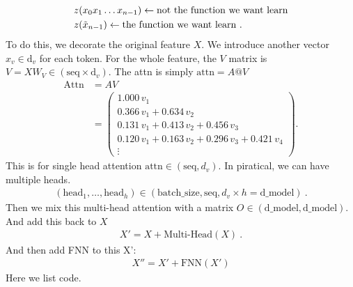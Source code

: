 \documentclass{article}
\newcommand{\bs}{\textrm{batch\_size}}
\newcommand{\seq}{\textrm{seq}}
\newcommand{\dm}{\textrm{d\_model}}
\begin{document}
\begin{align}
    &z(x_0x_1\dots x_{n-1}) \leftarrow \text{not the function we want learn} \\
    &z(\Tilde{x}_{n-1})  \leftarrow \text{the function we want learn} ~.
\end{align}
To do this, we decorate the original feature $X$. We introduce another vector \(x_v \in \text{d}_v\) for each token. For the whole feature, the $V$ matrix is $V=XW_V \in (\seq \times \text{d}_v)$. The attn is simply \( \text{attn} = A@V\)
\begin{align}
\mathrm{Attn}
&=
A V \\
&=
\begin{pmatrix}
1.000\,v_1 \\
0.366\,v_1 + 0.634\,v_2 \\
0.131\,v_1 + 0.413\,v_2 + 0.456\,v_3 \\
0.120\,v_1 + 0.163\,v_2 + 0.296\,v_3 + 0.421\,v_4 \\
\vdots
\end{pmatrix}.
\end{align}
This is for single head attention $\textrm{attn}\in (\seq, d_{v})$. In piratical, we can have multiple heads.
\begin{align}
    (\textrm{head}_1, \dots,\textrm{head}_{h}) \in (\bs, \seq, d_{v}\times h= \dm)~. 
\end{align}
Then we mix this multi-head attention with a matrix $O\in(\dm, \dm)$. And add this back to $X$
\begin{align}
    X' = X + \textrm{Multi-Head}(X)~.
\end{align} 
And then add FNN to this X':
\begin{align}
    X'' = X' + \textrm{FNN}(X')
\end{align}
Here we list code.
\end{document}
